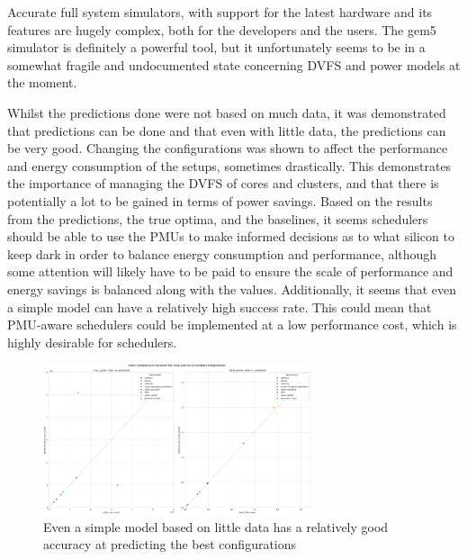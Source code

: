 Accurate full system simulators, with support for the latest hardware and its 
features are hugely complex, both for the developers and the users. The gem5 
simulator is definitely a powerful tool, but it unfortunately seems to be in a 
somewhat fragile and undocumented state concerning DVFS and power models at the 
moment.

Whilst the predictions done were not based on much data, it was demonstrated 
that predictions can be done and that even with little data, the predictions can
be very good. Changing the configurations was shown to affect the performance 
and energy consumption of the setups, sometimes drastically. This demonstrates 
the importance of managing the DVFS of cores and clusters, and that there is 
potentially a lot to be gained in terms of power savings. Based on the results 
from the predictions, the true optima, and the baselines, it seems schedulers 
should be able to use the PMUs to make informed decisions as to what silicon to 
keep dark in order to balance energy consumption and performance, although some 
attention will likely have to be paid to ensure the scale of performance and 
energy savings is balanced along with the values. Additionally, it seems that 
even a simple model can have a relatively high success rate. This could mean 
that PMU-aware schedulers could be implemented at a low performance cost, which 
is highly desirable for schedulers.
\begin{figure}[H]
    \centering
    \includegraphics[width=0.7\textwidth]{result-plots/stock-2b2L/system-scatter.png}
    \caption{Even a simple model based on little data has a relatively good
             accuracy at predicting the best configurations}
\end{figure}

